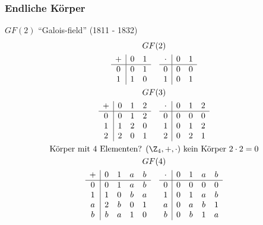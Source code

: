 \subsubsection{Endliche Körper}
$GF(2)$ \enquote{Galois-field} (1811 - 1832) \\
\begin{gather*}
	GF(2) \\
	\begin{array}{ c | c c }
		+	&0	&1	\\ \hline
		0	&0	&1	\\
		1	&1	&0	
	\end{array} \quad \begin{array}{ c | c c }
		\cdot	&0	&1	\\ \hline
		0	&0	&0	\\
		1	&0	&1	
	\end{array} \\
	GF(3) \\
	\begin{array}{ c | c c c }
		+	&0	&1	&2	\\ \hline
		0	&0	&1	&2	\\
		1	&1	&2	&0	\\
		2	&2	&0	&1
	\end{array} \quad \begin{array}{ c | c c c }
		\cdot	&0	&1	&2	\\ \hline
		0	&0	&0	&0	\\
		1	&0	&1	&2	\\
		2	&0	&2	&1	
	\end{array} \\
	\text{Körper mit 4 Elementen? } (\Z_4,+,\cdot) \text{ kein Körper } 2 \cdot 2 = 0 \\
	GF(4) \\
	\begin{array}{ c | c c c c }
		+	&0	&1	&a	&b	\\ \hline
		0	&0	&1	&a	&b	\\
		1	&1	&0	&b	&a	\\
		a	&2	&b	&0	&1	\\
		b	&b	&a	&1	&0	
	\end{array} \quad \begin{array}{ c | c c c c }
		\cdot	&0	&1	&a	&b	\\ \hline
		0	&0	&0	&0	&0	\\
		1	&0	&1	&a	&b	\\
		a	&0	&a	&b	&1	\\
		b	&0	&b	&1	&a	
	\end{array}
\end{gather*}

